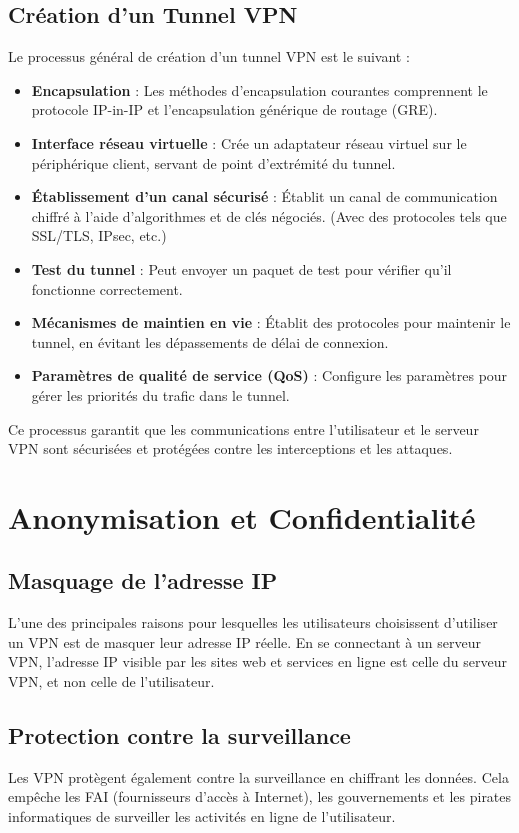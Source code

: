 \documentclass{report}
\begin{document}
\section{Création d'un Tunnel VPN}
Le processus général de création d’un tunnel VPN est le suivant \cite{1} :

\begin{itemize}
  \item \textbf{Encapsulation} : Les méthodes d’encapsulation courantes comprennent le protocole IP-in-IP et l’encapsulation générique de routage (GRE).
  \item \textbf{Interface réseau virtuelle} : Crée un adaptateur réseau virtuel sur le périphérique client, servant de point d’extrémité du tunnel.
  \item \textbf{Établissement d’un canal sécurisé} : Établit un canal de communication chiffré à l’aide d’algorithmes et de clés négociés. (Avec des protocoles tels que SSL/TLS, IPsec, etc.)
  \item \textbf{Test du tunnel} : Peut envoyer un paquet de test pour vérifier qu’il fonctionne correctement.
  \item \textbf{Mécanismes de maintien en vie} : Établit des protocoles pour maintenir le tunnel, en évitant les dépassements de délai de connexion.
  \item \textbf{Paramètres de qualité de service (QoS)} : Configure les paramètres pour gérer les priorités du trafic dans le tunnel.
\end{itemize}

Ce processus garantit que les communications entre l'utilisateur et le serveur VPN sont sécurisées et protégées contre les interceptions et les attaques.


\chapter{Anonymisation et Confidentialité}
\section{Masquage de l'adresse IP}
L'une des principales raisons pour lesquelles les utilisateurs choisissent d'utiliser un VPN est de masquer leur adresse IP réelle. En se connectant à un serveur VPN, l'adresse IP visible par les sites web et services en ligne est celle du serveur VPN, et non celle de l'utilisateur.

\section{Protection contre la surveillance}
Les VPN protègent également contre la surveillance en chiffrant les données. Cela empêche les FAI (fournisseurs d'accès à Internet), les gouvernements et les pirates informatiques de surveiller les activités en ligne de l'utilisateur.
\end{document}
